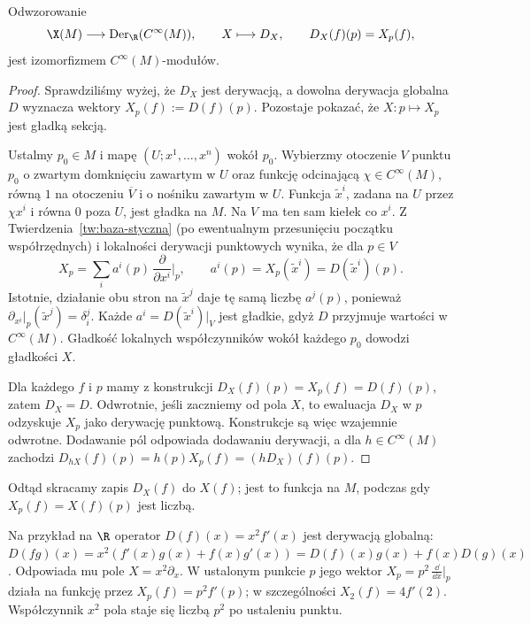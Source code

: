 \begin{twierdzenie}\label{thm:derywacje-pola}
Odwzorowanie
\[
 \X(M)\longrightarrow\operatorname{Der}_{\R}(C^\infty(M)),
 \qquad X\longmapsto D_X,\qquad D_X(f)(p)=X_p(f),
\]
jest izomorfizmem $C^\infty(M)$-modułów.
\end{twierdzenie}
\begin{proof}
Sprawdziliśmy wyżej, że $D_X$ jest derywacją, a dowolna
derywacja globalna $D$ wyznacza wektory $X_p(f):=D(f)(p)$.
Pozostaje pokazać, że $X\colon p\mapsto X_p$ jest gładką sekcją.

Ustalmy $p_0\in M$ i mapę $(U;x^1,\ldots,x^n)$ wokół $p_0$.
Wybierzmy otoczenie $V$ punktu $p_0$ o zwartym domknięciu zawartym w $U$
oraz funkcję odcinającą $\chi\in C^\infty(M)$, równą $1$ na
otoczeniu $\overline V$ i o nośniku zawartym w $U$.
Funkcja $\widetilde x^i$, zadana na $U$ przez $\chi x^i$ i równa
$0$ poza $U$, jest gładka na $M$. Na $V$ ma ten sam kiełek co $x^i$.
Z Twierdzenia~\ref{tw:baza-styczna} (po ewentualnym przesunięciu
początku współrzędnych) i lokalności derywacji punktowych
wynika, że dla $p\in V$
\[
 X_p=\sum_i a^i(p)\,\frac{\partial}{\partial x^i}\Big|_p,
 \qquad a^i(p)=X_p(\widetilde x^i)=D(\widetilde x^i)(p).
\]
Istotnie, działanie obu stron na $\widetilde x^j$ daje tę samą
liczbę $a^j(p)$, ponieważ
$\partial_{x^i}|_p(\widetilde x^j)=\delta_i^j$.
Każde $a^i=D(\widetilde x^i)|_V$ jest gładkie, gdyż $D$ przyjmuje
wartości w $C^\infty(M)$. Gładkość lokalnych współczynników
wokół każdego $p_0$ dowodzi gładkości $X$.

Dla każdego $f$ i $p$ mamy z konstrukcji
$D_X(f)(p)=X_p(f)=D(f)(p)$, zatem $D_X=D$.
Odwrotnie, jeśli zaczniemy od pola $X$, to ewaluacja $D_X$
w $p$ odzyskuje $X_p$ jako derywację punktową. Konstrukcje są więc
wzajemnie odwrotne. Dodawanie pól odpowiada dodawaniu derywacji,
a dla $h\in C^\infty(M)$ zachodzi
$D_{hX}(f)(p)=h(p)X_p(f)=(hD_X)(f)(p)$.
\end{proof}

Odtąd skracamy zapis $D_X(f)$ do $X(f)$; jest to funkcja na $M$,
podczas gdy $X_p(f)=X(f)(p)$ jest liczbą.

Na przykład na $\R$ operator $D(f)(x)=x^2f'(x)$ jest derywacją
globalną: $D(fg)(x)=x^2(f'(x)g(x)+f(x)g'(x))
=D(f)(x)g(x)+f(x)D(g)(x)$. Odpowiada mu pole
$X=x^2\partial_x$. W ustalonym punkcie $p$ jego wektor
$X_p=p^2\,\frac{\dd}{\dd x}\big|_p$ działa na funkcję przez
$X_p(f)=p^2f'(p)$; w szczególności $X_2(f)=4f'(2)$.
Współczynnik $x^2$ pola staje się liczbą $p^2$ po ustaleniu punktu.


